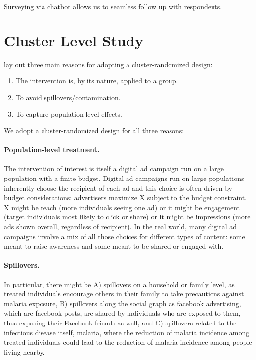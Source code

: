 \documentclass[a4paper,12pt]{article}
\theoremstyle{proposition}
\begin{document}
Surveying via chatbot allows us to seamless follow up with respondents. 

\section{Cluster Level Study}

\cite{Hayes2017} lay out three main reasons for adopting a cluster-randomized design:

\begin{enumerate}
\item The intervention is, by its nature, applied to a group.
\item To avoid spillovers/contamination.
\item To capture population-level effects.
\end{enumerate}

\noindent We adopt a cluster-randomized design for all three reasons:

\paragraph{Population-level treatment.} The intervention of interest is itself a digital ad campaign run on a large population with a finite budget. Digital ad campaigns run on large populations inherently choose the recipient of each ad and this choice is often driven by budget considerations: advertisers maximize X subject to the budget constraint. X might be reach (more individuals seeing one ad) or it might be engagement (target individuals most likely to click or share) or it might be impressions (more ads shown overall, regardless of recipient). In the real world, many digital ad campaigns involve a mix of all those choices for different types of content: some meant to raise awareness and some meant to be shared or engaged with.


\paragraph{Spillovers.} In particular, there might be A) spillovers on a household or family level, as treated individuals encourage others in their family to take precautions against malaria exposure, B) spillovers along the social graph as facebook advertising, which are facebook posts, are shared by individuals who are exposed to them, thus exposing their Facebook friends as well, and C) spillovers related to the infectious disease itself, malaria, where the reduction of malaria incidence among treated individuals could lead to the reduction of malaria incidence among people living nearby.
\end{document}
